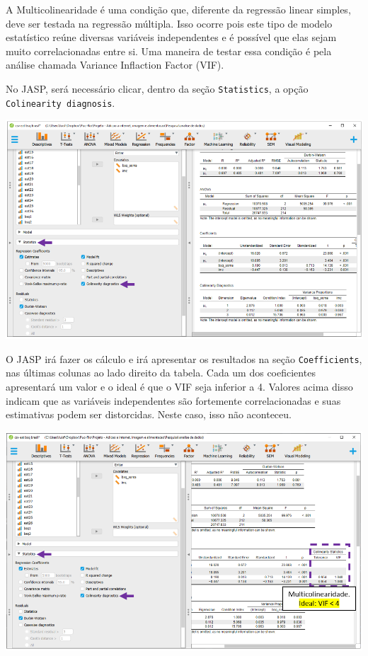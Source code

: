 \documentclass[
]{book}
\begin{document}
A Multicolinearidade é uma condição que, diferente da regressão linear simples, deve ser testada na regressão múltipla. Isso ocorre pois este tipo de modelo estatístico reúne diversas variáveis independentes e é possível que elas sejam muito correlacionadas entre si. Uma maneira de testar essa condição é pela análise chamada Variance Inflaction Factor (VIF).

No JASP, será necessário clicar, dentro da seção \texttt{Statistics}, a opção \texttt{Colinearity\ diagnosis}.

\includegraphics{./img/cap_reg_multipla_colinearidade_jasp.png}

O JASP irá fazer os cálculo e irá apresentar os resultados na seção \texttt{Coefficients}, nas últimas colunas ao lado direito da tabela. Cada um dos coeficientes apresentará um valor e o ideal é que o VIF seja inferior a 4. Valores acima disso indicam que as variáveis independentes são fortemente correlacionadas e suas estimativas podem ser distorcidas. Neste caso, isso não aconteceu.

\includegraphics{./img/cap_reg_multipla_colinearidade2_jasp.png}
\end{document}

